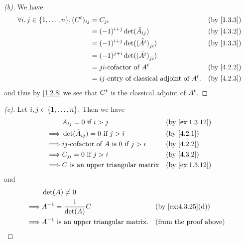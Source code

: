 \begin{proof}[(b)]
  We have
  \begin{align*}
    \forall i, j \in \set{1, \dots, n}, (\tp{C})_{i j} & = C_{j i}                                           &  & \by{1.3.3} \\
                                                       & = (-1)^{i + j} \det(\tilde{A}_{i j})                &  & \by{4.3.2} \\
                                                       & = (-1)^{i + j} \det(\tilde{(\tp{A})}_{j i})         &  & \by{1.3.3} \\
                                                       & = (-1)^{j + i} \det(\tilde{(\tp{A})}_{j i})                         \\
                                                       & = j i\text{-cofactor of } \tp{A}                    &  & \by{4.2.2} \\
                                                       & = i j\text{-entry of classical adjoint of } \tp{A}. &  & \by{4.2.3}
  \end{align*}
  and thus by \cref{1.2.8} we see that \({C}^{t}\) is the classical adjoint of \({A}^{t}\).
\end{proof}

\begin{proof}[(c)]
  Let \(i, j \in \left\lbrace1, \dots, n\right\rbrace\).
  Then we have
  \begin{align*}
             & A_{i j} = 0 \text{ if } i > j                             &  & \by{ex:1.3.12} \\
    \implies & \det(\tilde{A}_{i j}) = 0 \text{ if } j > i               &  & \by{4.2.1}     \\
    \implies & i j\text{-cofactor of } A \text{ is } 0 \text{ if } j > i &  & \by{4.2.2}     \\
    \implies & C_{j i} = 0 \text{ if } j > i                             &  & \by{4.3.2}     \\
    \implies & C \text{ is an upper triangular matrix}                   &  & \by{ex:1.3.12}
  \end{align*}
  and
  \begin{align*}
             & \det(A) \neq 0                                                                   \\
    \implies & A^{-1} = \dfrac{1}{\det(A)} C                 &  & \by{ex:4.3.25}[d]             \\
    \implies & A^{-1} \text{ is an upper triangular matrix}. &  & \text{(from the proof above)}
  \end{align*}
\end{proof}

